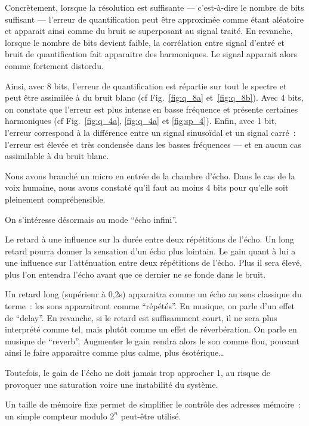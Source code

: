 \documentclass{article}
\begin{document}
Concrètement, lorsque la résolution est suffisante --- c'est-à-dire le nombre de bits suffisant --- l'erreur de quantification peut être approximée comme étant aléatoire et apparait ainsi comme du bruit se superposant au signal traité. En revanche, lorsque le nombre de bits devient faible, la corrélation entre signal d'entré et bruit de quantification fait apparaitre des harmoniques. Le signal apparait alors comme fortement distordu.

Ainsi, avec 8 bits, l'erreur de quantification est répartie sur tout le spectre et peut être assimilée à du bruit blanc (cf Fig.~\ref{fig:q_8a} et~\ref{fig:q_8b}).
Avec 4 bits, on constate que l'erreur est plus intense en basse fréquence et présente certaines harmoniques (cf Fig.~\ref{fig:q_4a}, \ref{fig:q_4a} et \ref{fig:sp_4}).
Enfin, avec 1 bit, l'erreur correspond à la différence entre un signal sinusoïdal et un signal carré~: l'erreur est élevée et très condensée dans les basses fréquences --- et en aucun cas assimilable à du bruit blanc.

Nous avons branché un micro en entrée de la chambre d'écho. Dans le cas de la voix humaine, nous avons constaté qu'il faut au moins 4 bits pour qu'elle soit pleinement compréhensible.




On s'intéresse désormais au mode ``écho infini''.

Le retard à une influence sur la durée entre deux répétitions de l'écho. Un long retard pourra donner la sensation d'un écho plus lointain.
Le gain quant à lui a une influence sur l'atténuation entre deux répétitions de l'écho. Plus il sera élevé, plus l'on entendra l'écho avant que ce dernier ne se fonde dans le bruit.

Un retard long (supérieur à 0,2s) apparaitra comme un écho au sens classique du terme~: les sons apparaitront comme ``répétés''. En musique, on parle d'un effet de ``delay''. En revanche, si le retard est suffisamment court, il ne sera plus interprété comme tel, mais plutôt comme un effet de réverbération. On parle en musique de ``reverb''. Augmenter le gain rendra alors le son comme flou, pouvant ainsi le faire apparaitre comme plus calme, plus ésotérique\dots

Toutefois, le gain de l'écho ne doit jamais trop approcher 1, au risque de provoquer une saturation voire une instabilité du système.



Un taille de mémoire fixe permet de simplifier le contrôle des adresses mémoire~: un simple compteur modulo $2^n$ peut-être utilisé.
\end{document}
